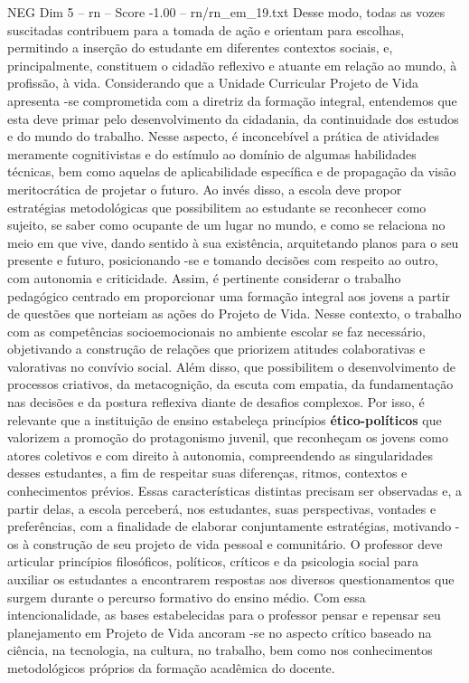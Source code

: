 \begin{textsample}{NEG Dim 5 – rn – Score -1.00 – rn/rn\_em\_19.txt}
Desse modo, todas as vozes suscitadas contribuem para a tomada de ação e orientam para escolhas, permitindo a inserção do estudante em diferentes contextos sociais, e, principalmente, constituem o cidadão reflexivo e atuante em relação ao mundo, à profissão, à vida.
Considerando que a Unidade Curricular Projeto de Vida apresenta -se comprometida com a diretriz da formação integral, entendemos que esta deve primar pelo desenvolvimento da cidadania, da continuidade dos estudos e do mundo do trabalho.
Nesse aspecto, é inconcebível a prática de atividades meramente cognitivistas e do estímulo ao domínio de algumas habilidades técnicas, bem como aquelas de aplicabilidade específica e de propagação da visão meritocrática de projetar o futuro.
Ao invés disso, a escola deve propor estratégias metodológicas que possibilitem ao estudante se reconhecer como sujeito, se saber como ocupante de um lugar no mundo, e como se relaciona no meio em que vive, dando sentido à sua existência, arquitetando planos para o seu presente e futuro, posicionando -se e tomando decisões com respeito ao outro, com autonomia e criticidade.
Assim, é pertinente considerar o trabalho pedagógico centrado em proporcionar uma formação integral aos jovens a partir de questões que norteiam as ações do Projeto de Vida.
Nesse contexto, o trabalho com as competências socioemocionais no ambiente escolar se faz necessário, objetivando a construção de relações que priorizem atitudes colaborativas e valorativas no convívio social.
Além disso, que possibilitem o desenvolvimento de processos criativos, da metacognição, da escuta com empatia, da fundamentação nas decisões e da postura reflexiva diante de desafios complexos.
Por isso, é relevante que a instituição de ensino estabeleça princípios \textbf{ético-políticos} que valorizem a promoção do protagonismo juvenil, que reconheçam os jovens como atores coletivos e com direito à autonomia, compreendendo as singularidades desses estudantes, a fim de respeitar suas diferenças, ritmos, contextos e conhecimentos prévios.
Essas características distintas precisam ser observadas e, a partir delas, a escola perceberá, nos estudantes, suas perspectivas, vontades e preferências, com a finalidade de elaborar conjuntamente estratégias, motivando -os à construção de seu projeto de vida pessoal e comunitário.
O professor deve articular princípios filosóficos, políticos, críticos e da psicologia social para auxiliar os estudantes a encontrarem respostas aos diversos questionamentos que surgem durante o percurso formativo do ensino médio.
Com essa intencionalidade, as bases estabelecidas para o professor pensar e repensar seu planejamento em Projeto de Vida ancoram -se no aspecto crítico baseado na ciência, na tecnologia, na cultura, no trabalho, bem como nos conhecimentos metodológicos próprios da formação acadêmica do docente.

\end{textsample}
